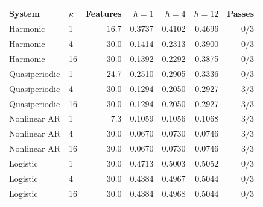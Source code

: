 \begin{tabular}{llrrrrr}
\toprule
System & $\kappa$ & Features & $h=1$ & $h=4$ & $h=12$ & Passes \\
\midrule
Harmonic & 1 & 16.7 & 0.3737 & 0.4102 & 0.4696 & 0/3 \\
Harmonic & 4 & 30.0 & 0.1414 & 0.2313 & 0.3900 & 0/3 \\
Harmonic & 16 & 30.0 & 0.1392 & 0.2292 & 0.3875 & 0/3 \\
\addlinespace[2pt]
Quasiperiodic & 1 & 24.7 & 0.2510 & 0.2905 & 0.3336 & 0/3 \\
Quasiperiodic & 4 & 30.0 & 0.1294 & 0.2050 & 0.2927 & 3/3 \\
Quasiperiodic & 16 & 30.0 & 0.1294 & 0.2050 & 0.2927 & 3/3 \\
\addlinespace[2pt]
Nonlinear AR & 1 & 7.3 & 0.1059 & 0.1056 & 0.1068 & 3/3 \\
Nonlinear AR & 4 & 30.0 & 0.0670 & 0.0730 & 0.0746 & 3/3 \\
Nonlinear AR & 16 & 30.0 & 0.0670 & 0.0730 & 0.0746 & 3/3 \\
\addlinespace[2pt]
Logistic & 1 & 30.0 & 0.4713 & 0.5003 & 0.5052 & 0/3 \\
Logistic & 4 & 30.0 & 0.4384 & 0.4967 & 0.5044 & 0/3 \\
Logistic & 16 & 30.0 & 0.4384 & 0.4968 & 0.5044 & 0/3 \\
\bottomrule
\end{tabular}
